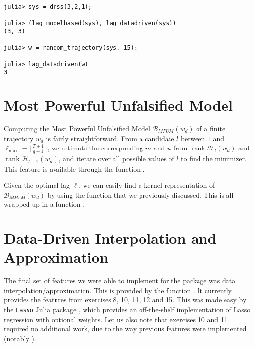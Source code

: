 \documentclass[11pt]{article}
\def\B{\mathscr{B}}
\def\rank{\operatorname{rank}}
\begin{document}
\begin{codebox}
\begin{verbatim}
julia> sys = drss(3,2,1);

julia> (lag_modelbased(sys), lag_datadriven(sys))
(3, 3)

julia> w = random_trajectory(sys, 15);

julia> lag_datadriven(w)
3
\end{verbatim}
\end{codebox}

\section{Most Powerful Unfalsified Model}
Computing the Most Powerful Unfalsified Model $\B_{MPUM}(w_d)$ of a finite trajectory $w_d$ is fairly straightforward. From a candidate $l$ between $1$ and $\ell_{\max} = \lfloor \frac{T+1}{q+1} \rfloor$, we estimate the corresponding $m$ and $n$ from $\rank \mathscr{H}_l (w_d)$ and $\rank \mathscr{H}_{l+1}(w_d)$, and iterate over all possible values of $l$ to find the minimizer. This feature is available through the function .

Given the optimal lag $\ell$, we can easily find a kernel representation of $\B_{MPUM}(w_d)$ by using the  function that we previously discussed. This is all wrapped up in a function .

\section{Data-Driven Interpolation and Approximation}

The final set of features we were able to implement for the package was data interpolation/approximation. This is provided by the function . It currently provides the features from exercises 8, 10, 11, 12 and 15. This was made easy by the \texttt{Lasso} Julia package \cite{lasso}, which provides an off-the-shelf implementation of Lasso regression with optional weights. Let us also note that exercises 10 and 11 required no additional work, due to the way previous features were implemented (notably ).
\end{document}
